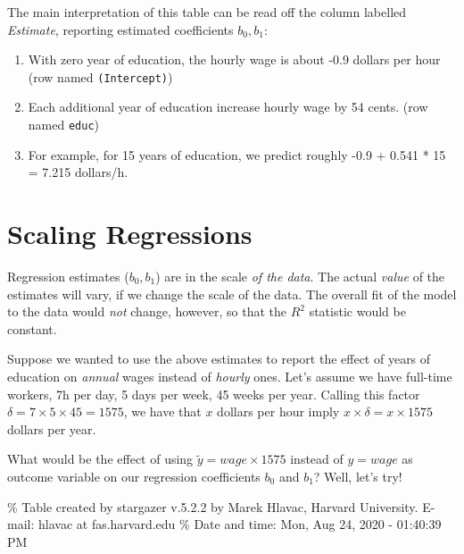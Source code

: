 \documentclass[]{book}
\providecommand{\tightlist}{%
  \setlength{\itemsep}{0pt}\setlength{\parskip}{0pt}}
\newenvironment{tip}{\begin{tcolorbox}[colback=green!5!white,colframe=green]}{\end{tcolorbox}}
\begin{document}
The main interpretation of this table can be read off the column
labelled \emph{Estimate}, reporting estimated coefficients \(b_0,b_1\):

\begin{enumerate}
\def\labelenumi{\arabic{enumi}.}
\tightlist
\item
  With zero year of education, the hourly wage is about -0.9 dollars per
  hour (row named \texttt{(Intercept)})
\item
  Each additional year of education increase hourly wage by 54 cents.
  (row named \texttt{educ})
\item
  For example, for 15 years of education, we predict roughly -0.9 +
  0.541 * 15 = 7.215 dollars/h.
\end{enumerate}

\section{Scaling Regressions}\label{scaling-regressions}

\begin{tip}
Regression estimates (\(b_0, b_1\)) are in the scale \emph{of the data}.
The actual \emph{value} of the estimates will vary, if we change the
scale of the data. The overall fit of the model to the data would
\emph{not} change, however, so that the \(R^2\) statistic would be
constant.
\end{tip}

Suppose we wanted to use the above estimates to report the effect of
years of education on \emph{annual} wages instead of \emph{hourly} ones.
Let's assume we have full-time workers, 7h per day, 5 days per week, 45
weeks per year. Calling this factor
\(\delta = 7 \times 5 \times 45 = 1575\), we have that \(x\) dollars per
hour imply \(x \times \delta = x \times 1575\) dollars per year.

What would be the effect of using \(\tilde{y} = wage \times 1575\)
instead of \(y = wage\) as outcome variable on our regression
coefficients \(b_0\) and \(b_1\)? Well, let's try!

\% Table created by stargazer v.5.2.2 by Marek Hlavac, Harvard
University. E-mail: hlavac at fas.harvard.edu \% Date and time: Mon, Aug
24, 2020 - 01:40:39 PM
\end{document}
